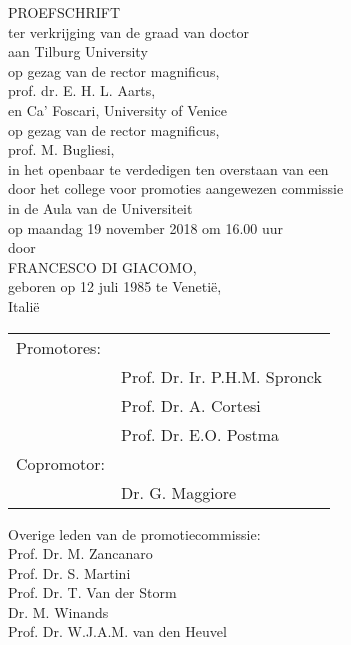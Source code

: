\begin{titlepage}\centering
  \large \MakeUppercase{\thetitle}
	
	\vspace*{1.5cm}
	\large PROEFSCHRIFT\\
	\vspace*{1.5cm}
ter verkrijging van de graad van doctor\\
aan Tilburg University\\
op gezag van de rector magnificus,\\
prof. dr. E. H. L. Aarts,\\
en Ca' Foscari, University of Venice\\
op gezag van de rector magnificus,\\
prof. M. Bugliesi,\\
in het openbaar te verdedigen ten overstaan van een\\
door het college voor promoties aangewezen commissie\\
in de Aula van de Universiteit\\
op maandag 19 november 2018 om 16.00 uur\\
\vspace*{1.5cm}
door\\
\vspace*{1.5cm}
\large FRANCESCO DI GIACOMO,\\
\vspace*{1.5cm}
geboren op 12 juli 1985 te Venetië,\\
Italië

\newpage
\flushleft

\begin{tabular}{l l}
Promotores: &\\
& Prof. Dr. Ir. P.H.M. Spronck\\
& Prof. Dr. A. Cortesi\\
& Prof. Dr. E.O. Postma\\
Copromotor: &\\
& Dr. G. Maggiore
\end{tabular}

\vspace{2.5cm}

Overige leden van de promotiecommissie:\\
\hspace{1.5cm} Prof. Dr. M. Zancanaro\\
\hspace{1.5cm} Prof. Dr. S. Martini\\
\hspace{1.5cm} Prof. Dr. T. Van der Storm\\
\hspace{1.5cm} Dr. M. Winands\\
\hspace{1.5cm} Prof. Dr. W.J.A.M. van den Heuvel

\end{titlepage}

\cleardoublepage
